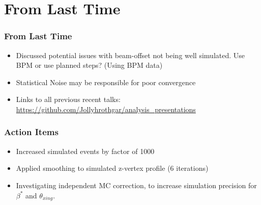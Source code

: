 \section{From Last Time}
\label{sec:from_last_time}

\begin{frame}
  \frametitle{From Last Time}
  \begin{itemize}
    \item Discussed potential issues with beam-offset not being well simulated.
      Use BPM or use planned steps? (Using BPM data)
    \item Statistical Noise may be responsible for poor convergence
    \item Links to all previous recent talks:
      \url{https://github.com/Jollyhrothgar/analysis_presentations}
  \end{itemize}
\end{frame}

\begin{frame}
  \frametitle{Action Items}
  \begin{itemize}
    \item Increased simulated events by factor of 1000
    \item Applied smoothing to simulated z-vertex profile (6 iterations)
    \item Investigating independent MC correction, to increase simulation
      precision for $\beta^*$ and $\theta_{xing}$. 
  \end{itemize}
\end{frame}
